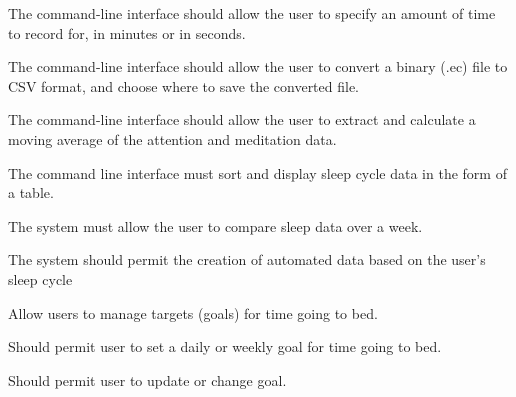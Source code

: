 \begin{reqtable}
  {The command-line interface should allow the user to specify an amount of time to record for, in
    minutes or in seconds.}
  \phigh
  \deps{\ref{sreq:allow-user-record-data}}

  {The command-line interface should allow the user to convert a binary (.ec) file to CSV format,
    and choose where to save the converted file.}
  \phigh
  \deps{\ref{sreq:facilitate-conversion}}

  {The command-line interface should allow the user to extract and calculate a moving average of the
    attention and meditation data.}
  \phigh
  \deps{\ref{req:extract-data}}

  {The command line interface must sort and display sleep cycle data in the form of a table.}
  \phigh
  \deps{\ref{req:extract-data}, \ref{req:apply-sorting-algorithm}}

  
  \reqheader

  {The system must allow the user to compare sleep data over a week.}
  \phigh
  \deps{\ref{req:store-data}, \ref{req:manual-entry}}

  {The system should permit the creation of automated data based on the user's sleep cycle}
  \pmed
  \deps{\ref{req:store-data}}


  \reqheader

  {Allow users to manage targets (goals) for time going to bed.}
  \pmed
  \deps{\ref{req:store-data}, \ref{req:manual-entry}}

  {Should permit user to set a daily or weekly goal for time going to bed.}
  \pmed
  \dnone

  {Should permit user to update or change goal.}
  \pmed
  \dnone
  \sspec


\end{reqtable}
